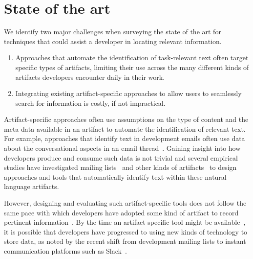\section{State of the art}
\label{cp1:novelty}



We identify two major challenges 
when surveying the state of the art for techniques that could assist 
a developer in locating relevant information.


\begin{enumerate}[label=\textit{\arabic*.},leftmargin=*]

    \item Approaches that automate the identification of task-relevant
    text often target specific
    types of artifacts, limiting their use across the
    many different kinds of artifacts developers encounter
    daily in their work.

    \item Integrating existing artifact-specific approaches to allow users to seamlessly search
    for information is costly, if not impractical.
\end{enumerate}




Artifact-specific approaches often use assumptions on the type of content 
and the meta-data available in an artifact to automate the identification of relevant text.
For example, approaches that identify text in development emails often use 
data about the conversational aspects in an email thread~\cite{Murray2008}.  
Gaining insight into how developers produce and consume 
such data is not trivial and several empirical studies have investigated 
mailing lists~\cite{Sorbo2015, panichella2012} and other kinds of artifacts~\cite{Ko2006, Arya2019, Maalej2013} 
to design approaches and tools that automatically identify
text within these natural language 
artifacts.


However, designing and evaluating such artifact-specific tools
does not follow the same pace with which developers have adopted 
some kind of artifact to record pertinent information~\cite{garousi2019}.
By the time an artifact-specific tool might be available~\cite{gibbs1994},
it is possible 
that developers have progressed to using new kinds of technology
to store data, as noted by the recent shift from 
development mailing lists to instant communication platforms such as Slack~\cite{Lin2016, Chatterjee2020}. 



